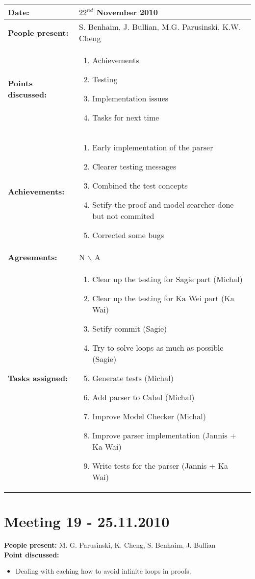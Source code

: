 \documentclass[12pt,a4paper]{article}
\newcommand{\meeting}[6]{%
\begin{center}%
\begin{longtable}{| p{3.5cm}  | p{13cm} |}%
\hline%
\textbf{Date:} & #1 \\%
\hline%
\textbf{People present:} &#2 \\%
\hline%
\textbf{Points discussed:} &#3\\%
\hline%
\textbf{Achievements:} &#4 \\%
\hline%
\textbf{Agreements:} &#5 \\%
\hline%
\textbf{Tasks assigned:} &#6  \\%
\hline%
\end{longtable}%
\end{center}%
\bigbreak
}
\begin{document}
\meeting{$22^{nd}$ November 2010}%
{S. Benhaim, J. Bullian, M.G. Parusinski, K.W. Cheng}%
{\begin{enumerate}
\item Achievements
\item Testing
\item Implementation issues
\item Tasks for next time
\end{enumerate}}%
{\begin{enumerate}
\item Early implementation of the parser
\item Clearer testing messages
\item Combined the test concepts
\item Setify the proof and model searcher done but not commited
\item Corrected some bugs
\end{enumerate}}%
{N $\backslash$ A}
{\begin{enumerate}
\item Clear up the testing for Sagie part (Michal)
\item Clear up the testing for Ka Wei part (Ka Wai)
\item Setify commit (Sagie)
\item Try to solve loops as much as possible (Sagie)
\item Generate tests (Michal)
\item Add parser to Cabal (Michal)
\item Improve Model Checker (Michal)
\item Improve parser implementation (Jannis + Ka Wai)
\item Write tests for the parser (Jannis + Ka Wai)
\end{enumerate}}%

\section*{Meeting 19 - 25.11.2010}
\textbf{People present:} M. G. Parusinski, K. Cheng, S. Benhaim, J. Bullian \\
\textbf{Point discussed:}
\begin{itemize}
\item Dealing with caching how to avoid infinite loops in proofs.
\end{itemize}
\end{document}
